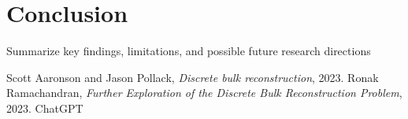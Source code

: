 \documentclass[12pt]{article}
\begin{document}
\section{Conclusion}
Summarize key findings, limitations, and possible future research directions

\newpage

\begin{thebibliography}{9}
    Scott Aaronson and Jason Pollack, \textit{Discrete bulk reconstruction}, 2023.
    Ronak Ramachandran, \textit{Further Exploration of the Discrete Bulk Reconstruction Problem}, 2023.
    ChatGPT
\end{thebibliography}
\end{document}
